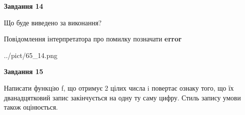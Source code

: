 \documentclass[11pt, ukrainian]{article}
\begin{document}
{\begin {large}
{\begin {center}\textbf{Завдання 14}\end {center}}\par
Що буде виведено за виконання? \par
Повідомлення інтерпретатора про помилку позначати \textbf{error}

\begin{center}
	{../pict/65_14.png}
\end{center}
\newpage

{\begin {center}\textbf{Завдання 15}\end {center}}\par

Написати функцiю f, що отримує 2 цілих числа i повертає ознаку того, що їх дванадцятковий запис закінчується на одну ту саму цифру. Стиль запису умови також оцінюється.\par
\newpage

\end {large}}
\end{document}
